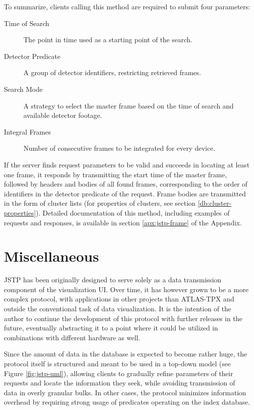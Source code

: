 To summarize, clients calling this method are required to submit four parameters:
\begin{description}
	\item[Time of Search]
	The point in time used as a starting point of the search.

	\item[Detector Predicate]
	A group of detector identifiers, restricting retrieved frames.

	\item[Search Mode]
	A strategy to select the master frame based on the time of search and available detector footage.

	\item[Integral Frames]
	Number of consecutive frames to be integrated for every device.
\end{description}

If the server finds request parameters to be valid and succeeds in locating at least one frame, it responds by transmitting the start time of the master frame, followed by headers and bodies of all found frames, corresponding to the order of identifiers in the detector predicate of the request. Frame bodies are transmitted in the form of cluster lists (for properties of clusters, see section \ref{db:cluster-properties}). Detailed documentation of this method, including examples of requests and responses, is available in section \ref{apx:jstp-frame} of the Appendix.

\section{Miscellaneous}
JSTP has been originally designed to serve solely as a data transmission component of the visualization UI. Over time, it has however grown to be a more complex protocol, with applications in other projects than ATLAS-TPX and outside the conventional task of data visualization. It is the intention of the author to continue the development of this protocol with further releases in the future, eventually abstracting it to a point where it could be utilized in combinations with different hardware as well.

Since the amount of data in the database is expected to become rather huge, the protocol itself is structured and meant to be used in a top-down model (see Figure \ref{fig:jstp-uml}), allowing clients to gradually refine parameters of their requests and locate the information they seek, while avoiding transmission of data in overly granular bulks. In other cases, the protocol minimizes information overhead by requiring strong usage of predicates operating on the index database.

